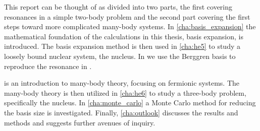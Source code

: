 \documentclass[../main/report.tex]{subfiles}
\begin{document}
This report can be thought of as divided into two parts, the first covering resonances in a simple two-body problem and the second part covering the first steps toward more complicated many-body systems. 
In \cref{cha:basis_expansion} the mathematical foundation of the calculations in this thesis, basis expansion, is introduced.
The basis expansion method is then used in \cref{cha:he5} to study a loosely bound nuclear system, the  nucleus.
In  we use the Berggren basis to reproduce the resonance in .

 is an introduction to many-body theory, focusing on fermionic systems. 
The many-body theory is then utilized in \cref{cha:he6} 
to study a three-body problem, specifically the  nucleus.  
In \cref{cha:monte_carlo} a Monte Carlo method for reducing the basis size is investigated. 
Finally, \cref{cha:outlook} discusses the results and methods and suggests further avenues of inquiry.
\end{document}
